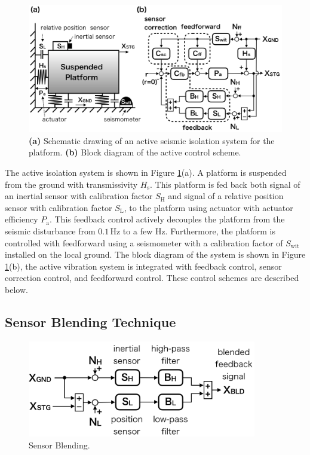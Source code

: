 \begin{figure}[h]
 \begin{center}
    \includegraphics[width=13.5cm]{./img_chap5/img503.png}
    \caption{{\bf(a)} Schematic drawing of an active seismic isolation system for the platform. {\bf(b)} Block diagram of the active control scheme.} \label{img:img503}
  \end{center}
\end{figure}
The active isolation system is shown in Figure \ref{img:img503}(a). A platform is suspended from the ground with transmissivity $H_{\mathrm{s}}$. This platform is fed back both signal of an inertial sensor with calibration factor $S_{\mathrm{H}}$ and signal of a relative position sensor with calibration factor $S_{\mathrm{L}}$, to the platform using actuator with actuator efficiency $P_{\mathrm{a}}$. This feedback control actively decouples the platform from the seismic disturbance from $0.1\,\mathrm{Hz}$ to a few Hz. Furthermore, the platform is controlled with feedforward using a seismometer with a calibration factor of $S_{\mathrm{wit}}$ installed on the local ground. The block diagram of the system is shown in Figure \ref{img:img503}(b), the active vibration system is integrated with feedback control, sensor correction control, and feedforward control. These control schemes are described below.

\subsection{Sensor Blending Technique}
\begin{figure}[h]
  \begin{center}   
    \includegraphics[width=10cm]{./img_chap5/img507.png}
    \caption{Sensor Blending.} \label{img:img507}
  \end{center}
\end{figure}

